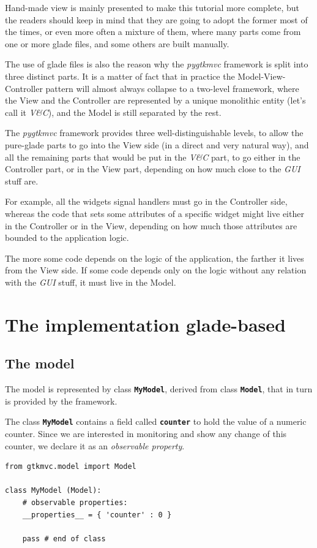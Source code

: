 \documentclass{article}
\newcommand{\kw}[1]{\emph{#1}\xspace}
\newcommand{\gui}{\kw{GUI}}
\newcommand{\pygtkmvc}{\kw{pygtkmvc}}
\newcommand{\codename}[1]{\texttt{\bfseries \textcolor {codecolor}{#1}}\xspace}
\newcommand{\codesize}{\small } %
\newcommand{\vc}{\kw{V\&C}}
\begin{document}
Hand-made view is mainly presented to make this tutorial more
complete, but the readers should keep in mind that they are going to
adopt the former most of the times, or even more often a mixture of
them, where many parts come from one or more glade files, and some
others are built manually.

The use of glade files is also the reason why the \pygtkmvc framework
is split into three distinct parts. It is a matter of fact that in
practice the Model-View-Controller pattern will almost always collapse
to a two-level framework, where the View and the Controller are
represented by a unique monolithic entity (let's call it \vc),
and the Model is still separated by the rest.

The \pygtkmvc framework provides three well-distinguishable levels, to
allow the pure-glade parts to go into the View side (in a direct and
very natural way), and all the remaining parts that would be put in
the \vc part, to go either in the Controller part, or in the View
part, depending on how much close to the \gui stuff are.

For example, all the widgets signal handlers must go in the Controller
side, whereas the code that sets some attributes of a specific widget
might live either in the Controller or in the View, depending on how
much those attributes are bounded to the application logic.

The more some code depends on the logic of the application, the
farther it lives from the View side. If some code depends only on the
logic without any relation with the \gui stuff, it must live in the
Model.


\section{The implementation glade-based}

\subsection{The model}
The model is represented by class \codename{MyModel}, derived from
class \codename{Model}, that in turn is provided by the framework.

The class \codename{MyModel} contains a field called
\codename{counter} to hold the value of a numeric counter. Since we
are interested in monitoring and show any change of this counter, we
declare it as an \emph{observable property}.


{ \codesize 
\begin{verbatim}   
from gtkmvc.model import Model

class MyModel (Model):
    # observable properties:
    __properties__ = { 'counter' : 0 }

    pass # end of class
\end{verbatim}
} 
\end{document}
